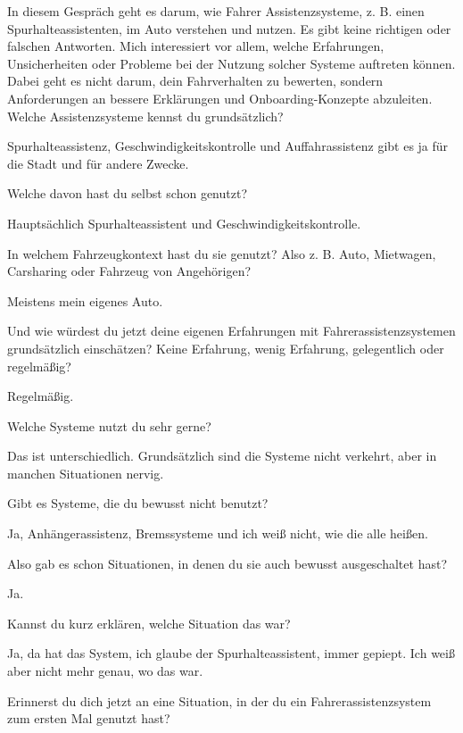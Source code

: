 \interviewerin
In diesem Gespräch geht es darum, wie Fahrer Assistenzsysteme, z. B.
einen Spurhalteassistenten, im Auto verstehen und nutzen. Es gibt keine
richtigen oder falschen Antworten. Mich interessiert vor allem, welche
Erfahrungen, Unsicherheiten oder Probleme bei der Nutzung solcher
Systeme auftreten können. Dabei geht es nicht darum, dein Fahrverhalten
zu bewerten, sondern Anforderungen an bessere Erklärungen und
Onboarding-Konzepte abzuleiten. Welche Assistenzsysteme kennst du
grundsätzlich?

Spurhalteassistenz, Geschwindigkeitskontrolle und Auffahrassistenz gibt
es ja für die Stadt und für andere Zwecke.

\interviewerin
Welche davon hast du selbst schon genutzt?

Hauptsächlich Spurhalteassistent und Geschwindigkeitskontrolle.

\interviewerin
In welchem Fahrzeugkontext hast du sie genutzt? Also z. B. Auto,
Mietwagen, Carsharing oder Fahrzeug von Angehörigen?

Meistens mein eigenes Auto.

\interviewerin
Und wie würdest du jetzt deine eigenen Erfahrungen mit
Fahrerassistenzsystemen grundsätzlich einschätzen? Keine Erfahrung,
wenig Erfahrung, gelegentlich oder regelmäßig?

Regelmäßig.

\interviewerin
Welche Systeme nutzt du sehr gerne?

Das ist unterschiedlich. Grundsätzlich sind die Systeme nicht verkehrt,
aber in manchen Situationen nervig.

\interviewerin
Gibt es Systeme, die du bewusst nicht benutzt?

Ja, Anhängerassistenz, Bremssysteme und ich weiß nicht, wie die alle
heißen.

\interviewerin
Also gab es schon Situationen, in denen du sie auch bewusst
ausgeschaltet hast?

Ja.

\interviewerin
Kannst du kurz erklären, welche Situation das war?

Ja, da hat das System, ich glaube der Spurhalteassistent, immer gepiept.
Ich weiß aber nicht mehr genau, wo das war.

\interviewerin
Erinnerst du dich jetzt an eine Situation, in der du ein
Fahrerassistenzsystem zum ersten Mal genutzt hast?

